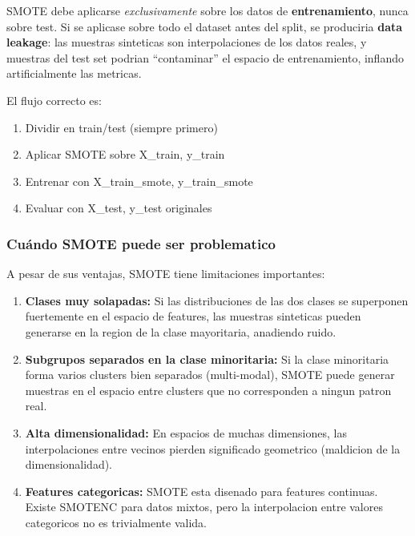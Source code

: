 \documentclass[12pt,a4paper]{article}
\begin{document}
\begin{tcolorbox}[warnbox, title={Regla Critica: SMOTE Solo en Entrenamiento}]
  SMOTE debe aplicarse \textit{exclusivamente} sobre los datos de \textbf{entrenamiento}, nunca
  sobre test. Si se aplicase sobre todo el dataset antes del split, se produciria \textbf{data
  leakage}: las muestras sinteticas son interpolaciones de los datos reales, y muestras del
  test set podrian ``contaminar'' el espacio de entrenamiento, inflando artificialmente las
  metricas.

  \medskip
  El flujo correcto es:
  \begin{enumerate}
    \item Dividir en train/test (siempre primero)
    \item Aplicar SMOTE sobre X\_train, y\_train
    \item Entrenar con X\_train\_smote, y\_train\_smote
    \item Evaluar con X\_test, y\_test originales
  \end{enumerate}
\end{tcolorbox}

\subsubsection*{Cuándo SMOTE puede ser problematico}

A pesar de sus ventajas, SMOTE tiene limitaciones importantes:

\begin{enumerate}[label=\textbf{\arabic*.}]
  \item \textbf{Clases muy solapadas:} Si las distribuciones de las dos clases se superponen
    fuertemente en el espacio de features, las muestras sinteticas pueden generarse en la region
    de la clase mayoritaria, anadiendo ruido.
  \item \textbf{Subgrupos separados en la clase minoritaria:} Si la clase minoritaria forma
    varios clusters bien separados (multi-modal), SMOTE puede generar muestras en el espacio
    entre clusters que no corresponden a ningun patron real.
  \item \textbf{Alta dimensionalidad:} En espacios de muchas dimensiones, las interpolaciones
    entre vecinos pierden significado geometrico (maldicion de la dimensionalidad).
  \item \textbf{Features categoricas:} SMOTE esta disenado para features continuas. Existe
    SMOTENC para datos mixtos, pero la interpolacion entre valores categoricos no es trivialmente
    valida.
\end{enumerate}
\end{document}
